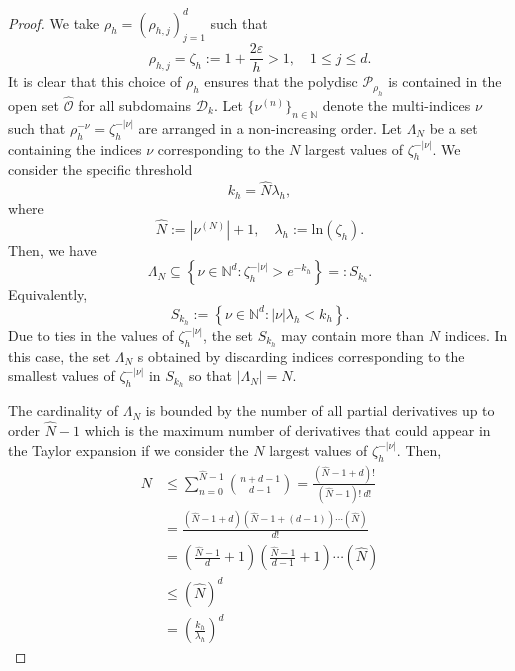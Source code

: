 \documentclass[12pt]{article}
\theoremstyle{remark}
\theoremstyle{definition}
\numberwithin{equation}{section}
\begin{document}
\begin{proof}
    We take $\rho_h=(\rho_{h,j})_{j=1}^d$ such that
    \begin{equation}
        \rho_{h,j}=\zeta_h :=1+\frac{2\varepsilon}{h}>1, \quad 1\leq j \leq d.
        \label{rho}
    \end{equation}
    It is clear that this choice of $\rho_h$ ensures that the polydisc $\mathcal{P}_{\rho_h}$ is contained in the open set $\hat{\mathcal{O}}$ for all subdomains $\mathcal{D}_k$. Let $\{\nu^{(n)}\}_{n \in \mathbb{N}}$ denote the multi-indices $\nu$ such that $\rho_h^{-\nu}=\zeta_h^{-|\nu|}$ are arranged in a non-increasing order. Let $\Lambda_N$ be a set containing the indices $\nu$ corresponding to the $N$ largest values of $\zeta_h^{-|\nu|}$. We consider the specific threshold
    \begin{equation}
        k_h= \hat{N} \lambda_{h}, 
        \label{kh}
    \end{equation}
    where
    \begin{equation}
        \hat{N}:=\left|\nu^{(N)}\right| +1, \quad \lambda_h:= \text{ln} (\zeta_h).
        \label{lambda def}
    \end{equation}
    Then, we have 
    \begin{equation}
        \Lambda_N\subseteq\left\{\nu \in \mathbb{N}^d: \zeta_h^{-|\nu|} > e^{-k_h}\right\}=:S_{k_h}.
    \end{equation}
    Equivalently, 
    \begin{equation}
        S_{k_h}:=\left\{\nu \in \mathbb{N}^d: \left|\nu\right| \lambda_h < k_h\right\}.
        \label{k}
    \end{equation}
    Due to ties in the values of $\zeta_h^{-|\nu|}$, the set $S_{k_h}$ may contain more than $N$ indices. In this case, the set $\Lambda_N$ s obtained by discarding indices corresponding to the smallest values of $\zeta_h^{-|\nu|}$ in $S_{k_h}$ so that $|\Lambda_N| = N$.
    
    The cardinality of $\Lambda_{N}$ is bounded by the number of all partial derivatives up to order $\hat{N}-1$ which is the maximum number of derivatives that could appear in the Taylor expansion if we consider the $N$ largest values of $\zeta_h^{-|\nu|}$. Then,
    \begin{align}
        N&\leq \sum_{n=0}^{\hat{N}-1} {n+d-1 \choose d-1} = \frac{\left(\hat{N}-1+d\right)!}{\left(\hat{N}-1\right)! \ d!}\\
        &= \frac{\left(\hat{N}-1+d\right) \left(\hat{N}-1+(d-1)\right) \cdots \left(\hat{N}\right)}{d!}\\
        &=\left(\frac{\hat{N}-1}{d} +1\right)\left(\frac{\hat{N}-1}{d-1} +1 \right) \cdots (\hat{N})\\
        &\leq (\hat{N})^d\\
        &=\left( \frac{k_h}{\lambda_h}\right)^d
        \label{est N}
    \end{align}
    

\end{proof}
\end{document}
